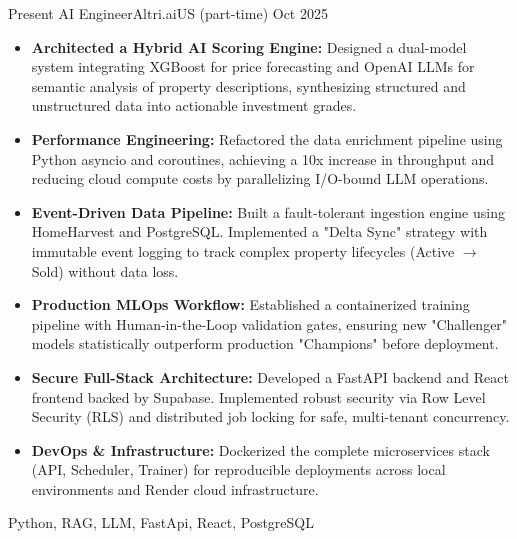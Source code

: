 \begin{experiences}
  \experience
    {Present}   {AI Engineer}{Altri.ai}{US (part-time)}
    {Oct 2025} {
      \begin{itemize}
        \item \textbf{Architected a Hybrid AI Scoring Engine:} Designed a dual-model system integrating XGBoost for price forecasting and OpenAI LLMs for semantic analysis of property descriptions, synthesizing structured and unstructured data into actionable investment grades.
        \item \textbf{Performance Engineering:} Refactored the data enrichment pipeline using Python asyncio and coroutines, achieving a 10x increase in throughput and reducing cloud compute costs by parallelizing I/O-bound LLM operations.
        \item \textbf{Event-Driven Data Pipeline:} Built a fault-tolerant ingestion engine using HomeHarvest and PostgreSQL. Implemented a "Delta Sync" strategy with immutable event logging to track complex property lifecycles (Active $\to$ Sold) without data loss.
        \item \textbf{Production MLOps Workflow:} Established a containerized training pipeline with Human-in-the-Loop validation gates, ensuring new "Challenger" models statistically outperform production "Champions" before deployment.
        \item \textbf{Secure Full-Stack Architecture:} Developed a FastAPI backend and React frontend backed by Supabase. Implemented robust security via Row Level Security (RLS) and distributed job locking for safe, multi-tenant concurrency.
        \item \textbf{DevOps \& Infrastructure:} Dockerized the complete microservices stack (API, Scheduler, Trainer) for reproducible deployments across local environments and Render cloud infrastructure.
      \end{itemize}
    }
    {Python, RAG, LLM, FastApi, React, PostgreSQL}
  \emptySeparator
\end{experiences}

\vspace{-2em}

